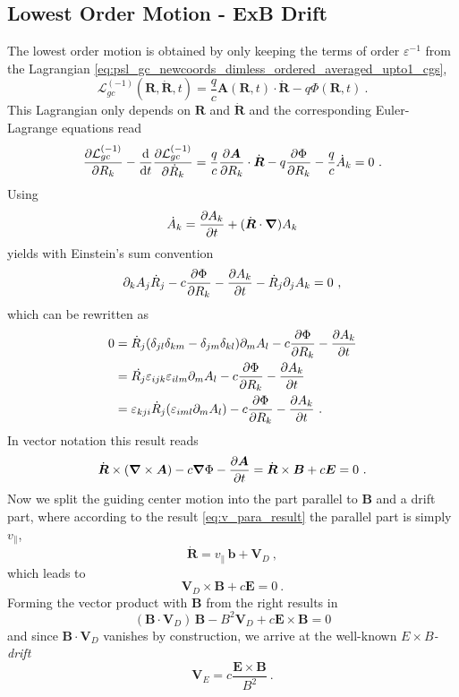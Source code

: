 \documentclass{scrartcl}
\renewcommand{\vec}[1]{\boldsymbol{#1}}
\newcommand{\uv}[1]{\hat{\vec{#1}}}
\newcommand{\bnabla}{\vec{\nabla}}
\newcommand{\rvgc}{\vec{R}} %
\newcommand{\PSL}{\mathcal{L}}
\newcommand{\subparallel}{{\scriptscriptstyle\parallel}}
\begin{document}
\subsection{Lowest Order Motion - ExB Drift}\label{sec:exb}
The lowest order motion is obtained by only keeping the terms of order $\varepsilon^{-1}$ from the Lagrangian \eqref{eq:psl_gc_newcoords_dimless_ordered_averaged_upto1_cgs},
\begin{equation*}
\PSL_{gc}^{(-1)}(\rvgc,\dot{\rvgc},t) = \frac{q}{c}\vec{A}(\rvgc,t)\cdot\dot{\rvgc} - q\Phi(\rvgc,t) \ .
\end{equation*}
This Lagrangian only depends on $\rvgc$ and $\dot{\rvgc}$ and the corresponding Euler-Lagrange equations read
\begin{equation*}
\pdv{\PSL_{gc}^{(-1)}}{R_k}-\dv{t}\pdv{\PSL_{gc}^{(-1)}}{\dot{R}_k} = \frac{q}{c}\pdv{\vec{A}}{R_k}\cdot{\dot{\rvgc}} - q\pdv{\Phi}{R_k} - \frac{q}{c}\dot{A}_k = 0 \ .
\end{equation*}
Using \begin{equation*}
\dot{A}_k = \pdv{A_k}{t} + (\dot{\rvgc}\cdot\bnabla)A_k
\end{equation*}
yields with Einstein's sum convention
\begin{equation*}
\partial_k{A_j}\dot{R}_j - c\pdv{\Phi}{R_k} - \pdv{A_k}{t} - \dot{R}_j\partial_jA_k = 0 \ ,
\end{equation*}
which can be rewritten as
\begin{align*}
0 &= \dot{R}_j(\delta_{jl}\delta_{km}-\delta_{jm}\delta_{kl})\partial_mA_l - c\pdv{\Phi}{R_k} - \pdv{A_k}{t} \\
&= \dot{R_j}\varepsilon_{ijk}\varepsilon_{ilm}\partial_mA_l - c\pdv{\Phi}{R_k} - \pdv{A_k}{t} \\
&= \varepsilon_{kji}\dot{R}_j(\varepsilon_{iml}\partial_mA_l) - c\pdv{\Phi}{R_k} - \pdv{A_k}{t}   \ .
\end{align*}
In vector notation this result reads
\begin{equation*}
\dot{\rvgc}\times(\bnabla\times\vec{A}) - c\bnabla\Phi - \pdv{\vec{A}}{t} = \dot{\rvgc}\times\vec{B} + c\vec{E} = 0 \ .
\end{equation*}
Now we split the guiding center motion into the part parallel to $\vec{B}$ and a drift part, where according to the result \eqref{eq:v_para_result} the parallel part is simply $v_\subparallel$,
\begin{equation*}
\dot{\rvgc} = v_\subparallel\,\uv{b} + \vec{V}_{\!\!D} \ ,
\end{equation*}
which leads to
\begin{equation*}
\vec{V}_{\!\!D}\times\vec{B} + c\vec{E} = 0 \ .
\end{equation*}
Forming the vector product with $\vec{B}$ from the right results in
\begin{equation*}
(\vec{B}\cdot\vec{V}_{\!\!D})\,\vec{B} - B^2\vec{V}_{\!\!D}  + c\vec{E}\times\vec{B} = 0
\end{equation*}
and since $\vec{B}\cdot\vec{V}_{\!\!D}$ vanishes by construction, we arrive at the well-known \emph{$E\times B$-drift}
\begin{equation*}
\vec{V}_{\!\!E} = c\frac{\vec{E}\times\vec{B}}{B^2} \ .
\end{equation*}
\end{document}
